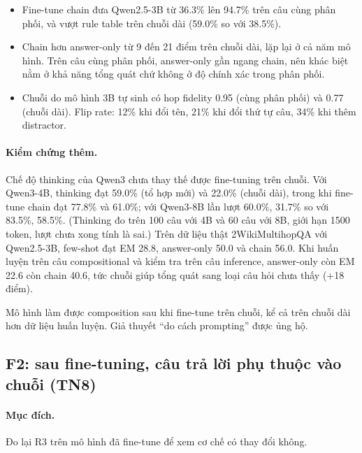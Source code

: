 \documentclass[11pt]{article}
\begin{document}
\begin{cachdoc}
\begin{itemize}[leftmargin=*,itemsep=1pt]
\item Fine-tune chain đưa Qwen2.5-3B từ 36.3\% lên 94.7\% trên câu cùng phân phối, và vượt rule table trên
  chuỗi dài (59.0\% so với 38.5\%).
\item Chain hơn answer-only từ 9 đến 21 điểm trên chuỗi dài, lặp lại ở cả năm mô hình. Trên câu cùng
  phân phối, answer-only gần ngang chain, nên khác biệt nằm ở khả năng tổng quát chứ không ở độ chính xác
  trong phân phối.
\item Chuỗi do mô hình 3B tự sinh có hop fidelity 0.95 (cùng phân phối) và 0.77 (chuỗi dài). Flip rate:
  12\% khi đổi tên, 21\% khi đổi thứ tự câu, 34\% khi thêm distractor.
\end{itemize}
\end{cachdoc}

\paragraph{Kiểm chứng thêm.} Chế độ thinking của Qwen3 chưa thay thế được fine-tuning trên chuỗi. Với
Qwen3-4B, thinking đạt 59.0\% (tổ hợp mới) và 22.0\% (chuỗi dài), trong khi fine-tune chain đạt 77.8\% và
61.0\%; với Qwen3-8B lần lượt 60.0\%, 31.7\% so với 83.5\%, 58.5\%. (Thinking đo trên 100 câu với 4B và
60 câu với 8B, giới hạn 1500 token, lượt chưa xong tính là sai.) Trên dữ liệu thật 2WikiMultihopQA với
Qwen2.5-3B, few-shot đạt EM 28.8, answer-only 50.0 và chain 56.0. Khi huấn luyện trên câu compositional
và kiểm tra trên câu inference, answer-only còn EM 22.6 còn chain 40.6, tức chuỗi giúp tổng quát sang
loại câu hỏi chưa thấy (+18 điểm).

\begin{ketluan}
Mô hình làm được composition sau khi fine-tune trên chuỗi, kể cả trên chuỗi dài hơn dữ liệu huấn luyện.
Giả thuyết ``do cách prompting'' được ủng hộ.
\end{ketluan}

\subsection{F2: sau fine-tuning, câu trả lời phụ thuộc vào chuỗi (TN8)}

\paragraph{Mục đích.} Đo lại R3 trên mô hình đã fine-tune để xem cơ chế có thay đổi không.
\end{document}
